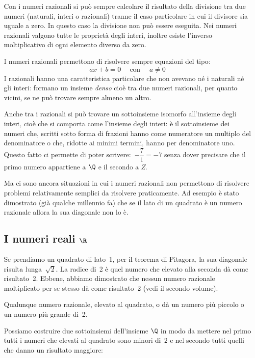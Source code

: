 Con i numeri razionali si può sempre calcolare il risultato della divisione tra 
due numeri (naturali, interi o razionali) tranne il caso particolare in cui il 
divisore sia uguale a zero. In questo caso la divisione non può essere eseguita.
Nei numeri razionali valgono tutte le proprietà degli interi, inoltre esiste 
l'inverso moltiplicativo di ogni elemento diverso da zero.

I numeri razionali permettono di risolvere sempre equazioni del tipo: 
\[ax+b=0 \quad \text{ con } \quad a \neq 0\]
I razionali hanno una caratteristica particolare che non avevano né i naturali 
né gli interi: formano un insieme \emph{denso} cioè tra due numeri razionali, 
per quanto vicini, se ne può trovare sempre almeno un altro.

Anche tra i razionali si può trovare un sottoinsieme isomorfo all'insieme degli 
interi, cioè che si comporta come l'insieme degli interi: è il sottoinsieme dei 
numeri che, scritti sotto forma di frazioni hanno come numeratore un multiplo 
del denominatore o che, ridotte ai minimi termini, hanno per denominatore uno. 
Questo fatto ci permette di poter scrivere:~\(-\dfrac{7}{1} = -7\) senza dover 
precisare che il primo numero appartiene a \(\Q\) e il secondo a \(Z\).

Ma ci sono ancora situazioni in cui i numeri razionali non permettono di 
risolvere problemi relativamente semplici da risolvere praticamente. Ad esempio 
è stato dimostrato (già qualche millennio fa) che se il lato di un quadrato è un 
numero razionale allora la sua diagonale non lo è. 

\subsection{I numeri reali \(\R\)} 
\label{subsec:insnum_reali}

Se prendiamo un quadrato di lato~1, per il teorema di Pitagora, la sua diagonale 
risulta lunga~\(\sqrt{2}\). La radice di~2 è quel numero che elevato alla 
seconda dà come risultato~2. Ebbene, abbiamo dimostrato che nessun numero 
razionale moltiplicato per se stesso dà come risultato~2 (vedi il secondo 
volume). 

Qualunque numero razionale, elevato al quadrato, o dà un numero più piccolo o un 
numero più grande di~2.

Possiamo costruire due sottoinsiemi dell'insieme \(\Q\) in modo da 
mettere nel primo tutti i numeri che elevati al quadrato sono minori di~2 e nel 
secondo tutti quelli che danno un risultato maggiore:

